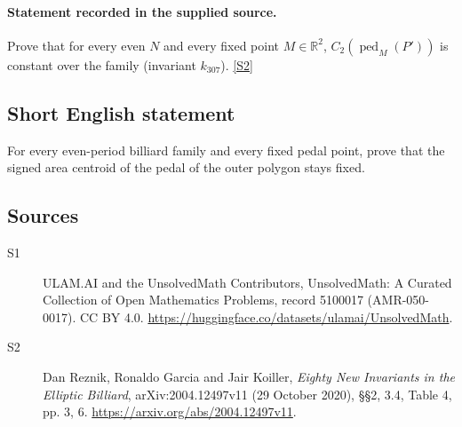 \documentclass[11pt]{article}
\newcommand{\sref}[2]{\hyperlink{source:#1:#2}{[S#2]}}
\begin{document}
\paragraph{Statement recorded in the supplied source.}
Prove that for every even $N$ and every fixed point $M\in\mathbb R^2$, $C_2(\operatorname{ped}_M(P'))$ is constant over the family (invariant $k_{307}$). \sref{5100017}{2}
\subsection{Short English statement}
For every even-period billiard family and every fixed pedal point, prove that the signed area centroid of the pedal of the outer polygon stays fixed.
\subsection{Sources}
\begin{description}
\item[\hypertarget{source:5100017:1}{S1}] ULAM.AI and the UnsolvedMath Contributors, UnsolvedMath: A Curated Collection of Open Mathematics Problems, record 5100017 (AMR-050-0017). CC BY 4.0. \url{https://huggingface.co/datasets/ulamai/UnsolvedMath}.
\item[\hypertarget{source:5100017:2}{S2}] Dan Reznik, Ronaldo Garcia and Jair Koiller, \emph{Eighty New Invariants in the Elliptic Billiard}, arXiv:2004.12497v11 (29 October 2020), \S\S2, 3.4, Table 4, pp. 3, 6. \url{https://arxiv.org/abs/2004.12497v11}.
\end{description}
\label{end:5100017}
\end{document}
